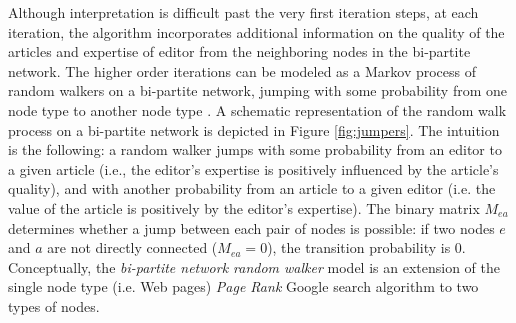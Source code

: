 Although interpretation is difficult past the very first iteration steps, at each iteration, the algorithm incorporates additional information on the quality of the articles and expertise of editor from the neighboring nodes in the bi-partite network. The higher order iterations 
%
%
can be modeled as a Markov process of random walkers on a bi-partite network, jumping with some probability from one node type to another node type \cite{caldarelli2012network}. A schematic representation of the random walk process on a bi-partite network is depicted in Figure \ref{fig:jumpers}. The intuition is the following: a random walker jumps with some probability from an editor to a given article (i.e., the editor's expertise is positively influenced by the article's quality), and with another probability from an article to a given editor (i.e. the value of the article is positively by the editor's expertise). The binary matrix $M_{ea}$ determines whether a jump between each pair of nodes is possible: if two nodes $e$ and $a$ are not directly connected ($M_{ea} = 0$), the transition probability is 0. Conceptually, the {\it bi-partite network random walker} model is an extension of the single node type (i.e. Web pages) {\it Page Rank} Google search algorithm \cite{page1999pagerank,kleinberg1999} to two types of nodes.


